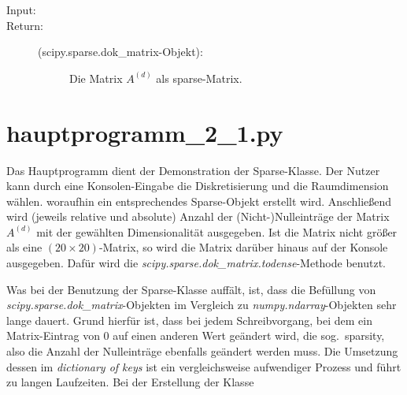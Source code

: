 \documentclass[a4paper,10pt,ngerman, openright]{sphinxmanual}
\begin{document}
\begin{fulllineitems}
\begin{fulllineitems}
\begin{description}
\item[{Input:}] \leavevmode
\item[{Return:}] \leavevmode\begin{description}
\item[{(scipy.sparse.dok\_matrix-Objekt):}] \leavevmode
Die Matrix $A^{(d)}$ als sparse-Matrix.

\end{description}

\end{description}

\end{fulllineitems}


\end{fulllineitems}

\chapter{hauptprogramm\_2\_1.py}

Das Hauptprogramm dient der Demonstration der Sparse-Klasse. Der Nutzer kann durch eine Konsolen-Eingabe die Diskretisierung und die Raumdimension wählen. woraufhin ein entsprechendes Sparse-Objekt erstellt wird. Anschließend wird (jeweils relative und absolute) Anzahl der (Nicht-)Nulleinträge der Matrix $A^{(d)}$ mit der gewählten Dimensionalität ausgegeben. Ist die Matrix nicht größer als eine $(20\times20)$-Matrix, so wird die Matrix darüber hinaus auf der Konsole ausgegeben. Dafür wird die \emph{scipy.sparse.dok\_matrix.todense}-Methode benutzt.

Was bei der Benutzung der Sparse-Klasse auffält, ist, dass die Befüllung von  \emph{scipy.sparse.dok\_matrix}-Objekten im Vergleich zu \emph{numpy.ndarray}-Objekten sehr lange dauert. Grund hierfür ist, dass bei jedem Schreibvorgang, bei dem ein Matrix-Eintrag von 0 auf einen anderen Wert geändert wird, die sog.~\glqq sparsity\grqq, also die Anzahl der Nulleinträge ebenfalls geändert werden muss. Die Umsetzung dessen im \emph{dictionary of keys} ist ein vergleichsweise aufwendiger Prozess und führt zu langen Laufzeiten. Bei der Erstellung der Klasse 



\end{document}
